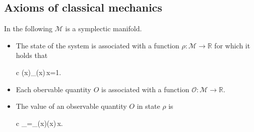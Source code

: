 \documentclass[11pt,oneside,%
]{memoir}
\newenvironment{eqna}{\begin{IEEEeqnarray}{c}}{\end{IEEEeqnarray}\ignorespacesafterend}
\theoremstyle{definition}
\newcommand{\RR}{\mathbb{R}}
\newcommand{\dd}{\mathrm{d}}
\begin{document}

\newpage

\subsection{Axioms of classical mechanics}

In the following \(\mathcal{M}\) is a symplectic manifold.

\begin{itemize}
    \item The state of the system is associated with a function \(\rho:\mathcal{M}\rightarrow\RR\) for which it holds that 
    \begin{eqna}
        \rho(x)\qquad{}\qquad\int_\rho(x)\,\dd x=1.\nonumber
    \end{eqna}
    \item Each obervable quantity \(O\) is associated with a function \(\mathcal{O}:\mathcal{M}\rightarrow\RR\).
    \item The value of an observable quantity \(O\) in state \(\rho\) is
    \begin{eqna}
        \langle{}\rangle_\rho=\int_\rho(x)(x)\,\dd x.\nonumber
    \end{eqna}
\end{itemize}
\end{document}
